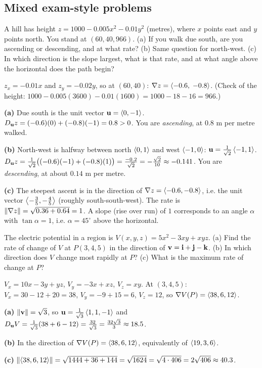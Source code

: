 \subsection{Mixed exam-style problems}

\begin{problem}\label{prob:hill}
A hill has height $z=1000-0.005x^2-0.01y^2$ (metres), where $x$ points east and
$y$ points north. You stand at $(60,40,966)$.
(a) If you walk due south, are you ascending or descending, and at what rate?
(b) Same question for north-west.
(c) In which direction is the slope largest, what is that rate, and at what
angle above the horizontal does the path begin?
\end{problem}
\begin{solution}
 $z_x=-0.01x$ and $z_y=-0.02y$, so at $(60,40)$: $\nabla z=\left\langle -0.6,\;-0.8 \right\rangle$.
(Check of the height: $1000-0.005(3600)-0.01(1600)=1000-18-16=966$.\checkok)

\textbf{(a)} Due south is the unit vector $\mathbf{u}=\left\langle 0,-1 \right\rangle$.
$D_{\mathbf{u}} z=(-0.6)(0)+(-0.8)(-1)=0.8>0$. You are \emph{ascending}, at $0.8$ m per metre walked.

\textbf{(b)} North-west is halfway between north $\left\langle 0,1 \right\rangle$ and west $\left\langle -1,0 \right\rangle$: $\mathbf{u}=\frac{1}{\sqrt2}\left\langle -1,1 \right\rangle$.
$D_{\mathbf{u}} z=\frac{1}{\sqrt2}\big((-0.6)(-1)+(-0.8)(1)\big)=\frac{-0.2}{\sqrt2}=-\frac{\sqrt2}{10}\approx-0.141$. You are
\emph{descending}, at about $0.14$ m per metre.

\textbf{(c)} The steepest ascent is in the direction of $\nabla z=\left\langle -0.6,-0.8 \right\rangle$, i.e. the unit vector
$\left\langle -\frac35,-\frac45 \right\rangle$ (roughly south-south-west). The rate is $\lVert\nabla z\rVert=\sqrt{0.36+0.64}=1$.
A slope (rise over run) of $1$ corresponds to an angle $\alpha$ with $\tan\alpha=1$, i.e. $\alpha=45^\circ$
above the horizontal.
\end{solution}

\begin{problem}\label{prob:p19}
The electric potential in a region is $V(x,y,z)=5x^2-3xy+xyz$.
(a) Find the rate of change of $V$ at $P(3,4,5)$ in the direction of
$\mathbf{v}=\mathbf{i}+\mathbf{j}-\mathbf{k}$.
(b) In which direction does $V$ change most rapidly at $P$?
(c) What is the maximum rate of change at $P$?
\end{problem}
\begin{solution}
 $V_x=10x-3y+yz$, $V_y=-3x+xz$, $V_z=xy$. At $(3,4,5)$:
$V_x=30-12+20=38$, $V_y=-9+15=6$, $V_z=12$, so $\nabla V(P)=\left\langle 38,6,12 \right\rangle$.

\textbf{(a)} $\lVert\mathbf{v}\rVert=\sqrt3$, so $\mathbf{u}=\frac{1}{\sqrt3}\left\langle 1,1,-1 \right\rangle$ and
$D_{\mathbf{u}} V=\frac{1}{\sqrt3}(38+6-12)=\frac{32}{\sqrt3}=\frac{32\sqrt3}{3}\approx18.5$.

\textbf{(b)} In the direction of $\nabla V(P)=\left\langle 38,6,12 \right\rangle$, equivalently of $\left\langle 19,3,6 \right\rangle$.

\textbf{(c)} $\lVert\left\langle 38,6,12 \right\rangle\rVert=\sqrt{1444+36+144}=\sqrt{1624}=\sqrt{4\cdot406}=2\sqrt{406}\approx40.3$.
\end{solution}


